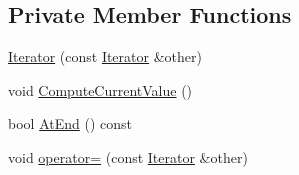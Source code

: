 \subsection*{\-Private \-Member \-Functions}
\begin{DoxyCompactItemize}
\item 
\hyperlink{classtesting_1_1internal_1_1CartesianProductGenerator3_1_1Iterator_a2b76c2e597bc9393f2b99e869e4fa8d2}{\-Iterator} (const \hyperlink{classtesting_1_1internal_1_1CartesianProductGenerator3_1_1Iterator}{\-Iterator} \&other)
\item 
void \hyperlink{classtesting_1_1internal_1_1CartesianProductGenerator3_1_1Iterator_a4c18cbbef042bab72ed484f5b6923908}{\-Compute\-Current\-Value} ()
\item 
bool \hyperlink{classtesting_1_1internal_1_1CartesianProductGenerator3_1_1Iterator_a6eb9b47ffa4b10f0dca403fc597faba0}{\-At\-End} () const 
\item 
void \hyperlink{classtesting_1_1internal_1_1CartesianProductGenerator3_1_1Iterator_ac087d740f6aa05ec07afd0c5c0327105}{operator=} (const \hyperlink{classtesting_1_1internal_1_1CartesianProductGenerator3_1_1Iterator}{\-Iterator} \&other)
\end{DoxyCompactItemize}
